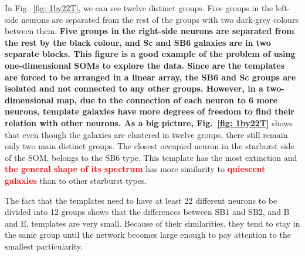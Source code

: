             In Fig.~\ref{fig: 1by22T}, we can see twelve distinct groups.
            Five groups in the left-side neurons are separated from the rest of the groups with two dark-grey colours between them.
            \textbf{Five groups in the right-side neurons are separated from the rest by the black colour, and Sc and SB6 galaxies are in two separate blocks.
            This figure is a good example of the problem of using one-dimensional SOMs to explore the data.
            Since are the templates are forced to be arranged in a linear array, the SB6 and Sc groups are isolated and not connected to any other groups.
            However, in a two-dimensional map, due to the connection of each neuron to 6 more neurons, template galaxies have more degrees of freedom to find their relation with other neurons.
            As a big picture, Fig.~\ref{fig: 1by22T}} shows that even though the galaxies are clustered in twelve groups, there still remain only two main distinct groups.
            The closest occupied neuron in the starburst side of the SOM, belongs to the SB6 type. 
            This template has the most extinction and \textbf{\textcolor{red}{ the general shape of its spectrum}} has more similarity to \textbf{\textcolor{red}{quiescent galaxies}} than to other starburst types. 
            
            The fact that the templates need to have at least 22 different neurons to be divided into 12 groups shows that the differences between SB1 and SB2, and B and E, templates are very small.
            Because of their similarities, they tend to stay in the same group until the network becomes large enough to pay attention to the smallest particularity.
           
